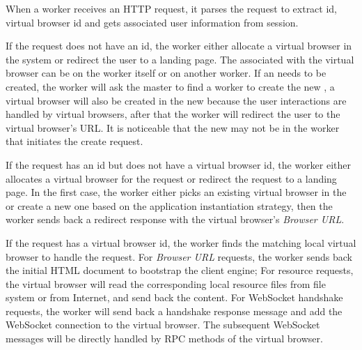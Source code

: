 When a worker receives an HTTP request, it parses the request to extract
\appins id, virtual browser id and gets associated user information from
session.

If the request does not have an \appins id, the worker either allocate a
virtual browser in the system or redirect the user to a landing page.  The
\appins{} associated with the virtual browser  can be on the worker itself or
on another worker.  If an \appins{} needs to be created, the worker will ask
the master to  find a worker to create the new \appins{}, a virtual browser
will also be created in the new \appins{} because the user interactions are
 handled by virtual browsers, after that the worker will redirect the user
to the virtual browser's URL. It is noticeable that the new \appins{} may not
be in the worker that initiates the create request.

If the request has an \appins id but does not have a virtual browser id, 
the worker either allocates a virtual browser for the request or
redirect the request to a landing page.
In the first case, the worker either 
picks an existing virtual browser in the \appins  or create a new one based on
the application instantiation strategy, then the worker sends back a redirect
response with  the virtual browser's \emph{Browser URL}.

If the request has a virtual browser id, the worker finds the matching local
virtual browser to handle the request. For \emph{Browser URL} requests, the
worker sends back the initial  HTML document to bootstrap the client engine;
For resource requests, the virtual browser will read the corresponding local
resource files from file system or from Internet, and send back the content.
For WebSocket handshake requests, the worker will send back a handshake
response message and add the WebSocket connection to the virtual browser. The
subsequent WebSocket messages will be directly handled by RPC methods  of the
virtual browser.




